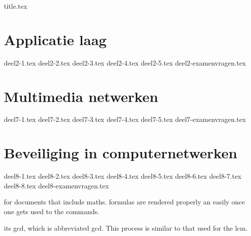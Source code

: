 \documentclass[a4paper,11pt]{article}
\begin{document}
{title.tex}

\clearpage
\thispagestyle{empty}

\tableofcontents

\clearpage



\setcounter{section}{1}
\section{Applicatie laag}
{deel2-1.tex}
{deel2-2.tex}
{deel2-3.tex}
{deel2-4.tex}
{deel2-5.tex}
{deel2-examenvragen.tex}

\setcounter{section}{6}
\section{Multimedia netwerken}
{deel7-1.tex}
{deel7-2.tex}
{deel7-3.tex}
{deel7-4.tex}
{deel7-5.tex}
{deel7-examenvragen.tex}

\setcounter{section}{7}
\section{Beveiliging in computernetwerken}
{deel8-1.tex}
{deel8-2.tex}
{deel8-3.tex}
{deel8-4.tex}
{deel8-5.tex}
{deel8-6.tex}
{deel8-7.tex}
{deel8-8.tex}
{deel8-examenvragen.tex}

\clearpage


for documents that include \gls{maths}. \Glspl{formula} are 
rendered properly an easily once one gets used to the commands.
 
its \acrlong{gcd}, which is abbreviated \acrshort{gcd}. This 
process is similar to that used for the \acrfull{lcm}.

\printglossaries

\clearpage
\end{document}
